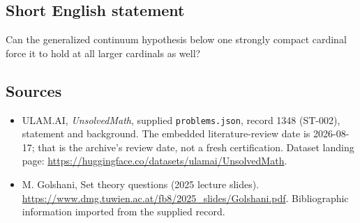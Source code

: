 \documentclass[11pt,a4paper]{article}
\begin{document}
\subsection{Short English statement}

Can the generalized continuum hypothesis below one strongly compact cardinal force it to hold at all larger cardinals as well?

\subsection{Sources}

{\small

\begin{itemize}

\item[\hypertarget{source:1348:1}{S1}] ULAM.AI, \emph{UnsolvedMath}, supplied \texttt{problems.json}, record 1348 (ST-002), statement and background. The embedded literature-review date is 2026-08-17; that is the archive’s review date, not a fresh certification. Dataset landing page: \url{https://huggingface.co/datasets/ulamai/UnsolvedMath}.

\item[\hypertarget{source:1348:2}{S2}] M. Golshani, Set theory questions (2025 lecture slides). \url{https://www.dmg.tuwien.ac.at/fb8/2025_slides/Golshani.pdf}. Bibliographic information imported from the supplied record.

\end{itemize}

}

\label{end:1348}
\end{document}
